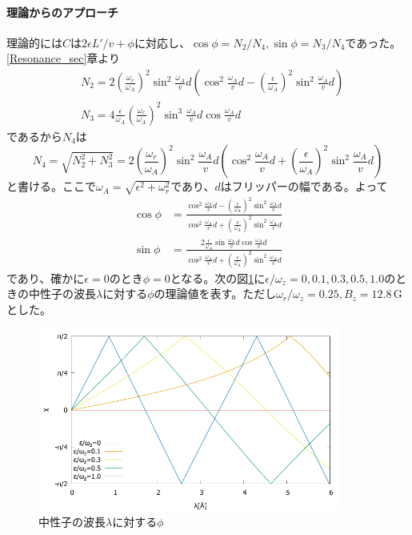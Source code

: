 \paragraph{理論からのアプローチ}
理論的には$C$は$2\epsilon L'/v +\phi$に対応し、$\cos\phi=N_2/N_4,\sin\phi=N_3/N_4$であった。\ref{Resonance_sec}章より
\begin{align}
&N_2 = 2\left(\frac{\omega_r}{\omega_A}\right)^2\sin^2\frac{\omega_A}{v}d \left(\cos^2 \frac{\omega_A}{v}d -\left(\frac{\epsilon}{\omega_A}\right)^2 \sin^2 \frac{\omega_A}{v}d\right) \\
&N_3 = 4\frac{\epsilon}{\omega_A} \left(\frac{\omega_r}{\omega_A}\right)^2\sin^3\frac{\omega_A}{v}d \cos \frac{\omega_A}{v}d
\end{align}
であるから$N_4$は
\begin{equation}
N_4=\sqrt{N_2^2+N_3^2}=2\left(\frac{\omega_r}{\omega_A}\right)^2\sin^2\frac{\omega_A}{v}d \left(\cos^2\frac{\omega_A}{v}d+\left(\frac{\epsilon}{\omega_A}\right)^2\sin^2\frac{\omega_A}{v}d\right)
\end{equation}
と書ける。ここで$\omega_A=\sqrt{\epsilon^2+\omega_r^2}$であり、$d$はフリッパーの幅である。よって
\begin{align}
\cos\phi&=\frac{\cos^2 \frac{\omega_A}{v}d -\left(\frac{\epsilon}{\omega_A}\right)^2 \sin^2 \frac{\omega_A}{v}d}{\cos^2\frac{\omega_A}{v}d+\left(\frac{\epsilon}{\omega_A}\right)^2\sin^2\frac{\omega_A}{v}d} \\
\sin\phi&=\frac{2\frac{\epsilon}{\omega_A}\sin\frac{\omega_A}{v}d \cos \frac{\omega_A}{v}d}{\cos^2\frac{\omega_A}{v}d+\left(\frac{\epsilon}{\omega_A}\right)^2\sin^2\frac{\omega_A}{v}d}
\end{align}
であり、確かに$\epsilon=0$のとき$\phi=0$となる。次の図\ref{Discussion_fig_phi}に$\epsilon/\omega_z=0,0.1,0.3,0.5,1.0$のときの中性子の波長$\lambda$に対する$\phi$の理論値を表す。ただし$\omega_r/\omega_z=0.25,B_z=12.8\,\mathrm{G}$とした。
\begin{figure}[h]
\centering
\includegraphics[width=10cm]{discussion/C/chi.pdf}
\caption{中性子の波長$\lambda$に対する$\phi$} \label{Discussion_fig_phi}
\end{figure}

